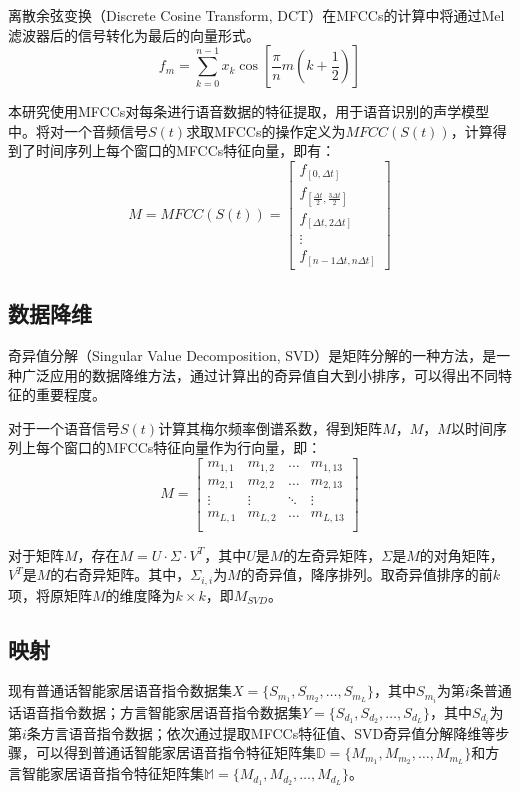 \documentclass[lang=cn,cite=super]{elegantpaper}
\begin{document}
离散余弦变换（Discrete Cosine Transform, DCT）在MFCCs的计算中将通过Mel滤波器后的信号转化为最后的向量形式。
\begin{equation}
    f_m = \sum_{k=0}^{n-1} x_k \cos [\frac{\pi}{n}m(k+\frac{1}{2})]
\end{equation}

本研究使用MFCCs对每条进行语音数据的特征提取，用于语音识别的声学模型中。将对一个音频信号$S(t)$求取MFCCs的操作定义为${MFCC}(S(t))$，计算得到了时间序列上每个窗口的MFCCs特征向量，即有：
\begin{equation}
    M = MFCC(S(t)) = 
    \begin{bmatrix}
        f_{[0,\Delta t]}\\
        f_{[\frac{\Delta t}{2},\frac{3\Delta t}{2}]}\\
        f_{[\Delta t,2\Delta t]}\\
        \vdots\\
        f_{[n-1\Delta t,n\Delta t]}
    \end{bmatrix}
\end{equation}
\subsection{数据降维}
奇异值分解（Singular Value Decomposition, SVD）是矩阵分解的一种方法，是一种广泛应用的数据降维方法，通过计算出的奇异值自大到小排序，可以得出不同特征的重要程度。

对于一个语音信号$S(t)$计算其梅尔频率倒谱系数，得到矩阵$M$，$M$，$M$以时间序列上每个窗口的MFCCs特征向量作为行向量，即：
\begin{equation}
    M = 
    \begin{bmatrix}
        m_{1,1} & m_{1,2} & \ldots & m_{1,13} \\
        m_{2,1} & m_{2,2} & \ldots & m_{2,13} \\
        \vdots & \vdots & \ddots & \vdots \\
        m_{L,1} & m_{L,2} & \ldots & m_{L,13}\\
    \end{bmatrix}
\end{equation}

对于矩阵$M$，存在$M = U \cdot \Sigma \cdot V^T$，其中$U$是$M$的左奇异矩阵，$\Sigma$是$M$的对角矩阵，$V^T$是$M$的右奇异矩阵。其中，$\Sigma_{i,i}$为$M$的奇异值，降序排列。取奇异值排序的前$k$项，将原矩阵$M$的维度降为$k \times k$，即$M_{SVD}$。
\subsection{映射}
现有普通话智能家居语音指令数据集$X=\{S_{m_1}, S_{m_2}, \ldots, S_{m_L}\}$，其中$S_{m_i}$为第$i$条普通话语音指令数据；方言智能家居语音指令数据集$Y=\{S_{d_1}, S_{d_2}, \ldots, S_{d_L}\}$，其中$S_{d_i}$为第$i$条方言语音指令数据；依次通过提取MFCCs特征值、SVD奇异值分解降维等步骤，可以得到普通话智能家居语音指令特征矩阵集$\mathbb{D} = \{ M_{m_1}, M_{m_2}, \ldots, M_{m_L}\}$和方言智能家居语音指令特征矩阵集$\mathbb{M} = \{ M_{d_1}, M_{d_2}, \ldots, M_{d_L}\}$。
\end{document}
